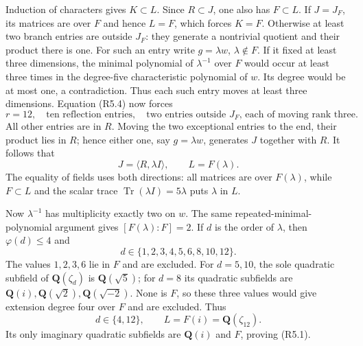 Induction of characters gives $K\subset L$.  Since $R\subset J$,
one also has $F\subset L$.  If $J=J_F$, its matrices are over $F$
and hence $L=F$, which forces $K=F$.
Otherwise at least two branch entries are outside $J_F$: they
generate a nontrivial quotient and their product there is one.
For such an entry write $g=\lambda w$, $\lambda\notin F$.
If it fixed at least three dimensions, the minimal polynomial of
$\lambda^{-1}$ over $F$ would occur at least three times in the
degree-five characteristic polynomial of $w$.  Its degree would
be at most one, a contradiction.  Thus each such entry moves at
least three dimensions.
Equation (R5.4) now forces
\[
 r=12,\quad \text{ten reflection entries},\quad
 \text{two entries outside }J_F\text{, each of moving rank three}.
                                                               \tag{R5.11}
\]
All other entries are in $R$.  Moving the two exceptional entries
to the end, their product lies in $R$; hence either one, say
$g=\lambda w$, generates $J$ together with $R$.
It follows that
\[
                         J=\langle R,\lambda I\rangle,
                         \qquad L=F(\lambda).
                                                               \tag{R5.12}
\]
The equality of fields uses both directions: all matrices are
over $F(\lambda)$, while $F\subset L$ and the scalar trace
$\operatorname{Tr}(\lambda I)=5\lambda$ puts $\lambda$ in $L$.

Now $\lambda^{-1}$ has multiplicity exactly two on $w$.
The same repeated-minimal-polynomial argument gives
$[F(\lambda):F]=2$.
If $d$ is the order of $\lambda$, then $\varphi(d)\le4$ and
\[
                         d\in\{1,2,3,4,5,6,8,10,12\}.
\]
The values $1,2,3,6$ lie in $F$ and are excluded.
For $d=5,10$, the sole quadratic subfield of $\mathbf Q(\zeta_d)$
is $\mathbf Q(\sqrt5)$; for $d=8$ its quadratic subfields are
$\mathbf Q(i),\mathbf Q(\sqrt2),\mathbf Q(\sqrt{-2})$.
None is $F$, so these three values would give extension degree
four over $F$ and are excluded.  Thus
\[
                    d\in\{4,12\},\qquad
                    L=F(i)=\mathbf Q(\zeta_{12}).
                                                               \tag{R5.13}
\]
Its only imaginary quadratic subfields are $\mathbf Q(i)$ and
$F$, proving (R5.1).

